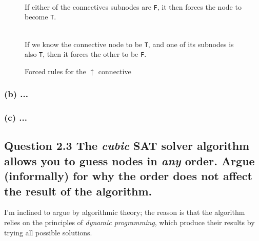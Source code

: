 \begin{figure}[H]
\begin{multicols}{3}
	\\
	If either of the connectives subnodes are {\tt F}, it then forces the
	node to become {\tt T}.
	
	\vfill
	\columnbreak
	
	\\
	If we know the connective node to be {\tt T}, and one of its subnodes is
	also {\tt T}, then it forces the other to be {\tt F}.
	
	\end{multicols}
	\label{fig:uparrow-forced-rules}
	\caption{Forced rules for the $\uparrow$ connective}
\end{figure}

\subsubsection*{(b) \mdseries ...}
\subsubsection*{(c) \mdseries ...}

\subsection*{Question 2.3 \mdseries The {\it cubic} SAT solver algorithm
allows you to guess nodes in {\it any} order. Argue (informally) for why the
order does not affect the result of the algorithm.}
I'm inclined to argue by algorithmic theory; the reason is that the algorithm
relies on the principles of {\it dynamic programming}, which produce their
results by trying all possible solutions.


